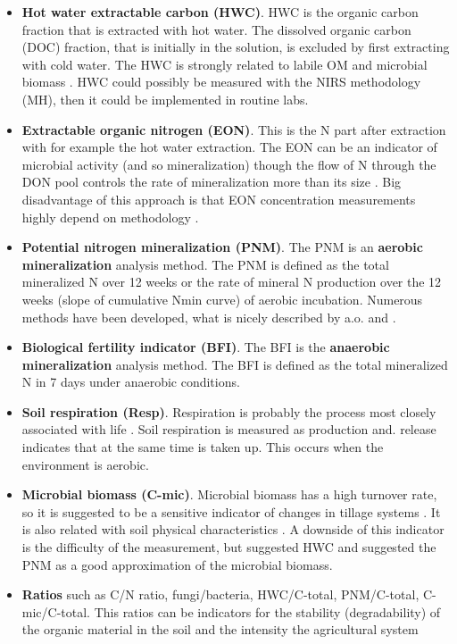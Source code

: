 \documentclass[10pt,twoside,dutch,english]{report}
\begin{document}
\begin{itemize}
	\item \textbf{Hot water extractable carbon (HWC)}. HWC is the organic carbon fraction that is extracted with hot water. The dissolved organic carbon (DOC) fraction, that is initially in the solution, is excluded by first extracting with cold water.  The HWC is strongly related to labile OM and microbial biomass \citep{Ghani2002, Ghani2003}. HWC could possibly be measured with the NIRS methodology (MH), then it could be implemented in routine labs. 
	\item \textbf{Extractable organic nitrogen (EON)}. This is the N part after extraction with for example the hot water extraction. The EON can be an indicator of microbial activity (and so mineralization) though the flow of N through the DON pool controls the rate of mineralization more than its size \citep{Schimel2004}. Big disadvantage of this approach is that EON concentration measurements highly depend on methodology \citep{Ros2009}. 
	
	\item \textbf{Potential nitrogen mineralization (PNM)}. The PNM is an \textbf{aerobic mineralization} analysis method. The PNM is defined as the total mineralized N over 12 weeks or the rate of mineral N production over the 12 weeks (slope of cumulative Nmin curve) of aerobic incubation. Numerous methods have been developed, what is nicely described by a.o. \citet{Doran1996} and \citet{Canali2005}.
	
	\item \textbf{Biological fertility indicator (BFI)}. The BFI is the \textbf{anaerobic mineralization} analysis method. The BFI is defined as the total mineralized N in 7 days under anaerobic conditions.
	
	\item \textbf{Soil respiration (Resp)}. Respiration is probably the process most closely associated with life \citep{Bloem2005}. Soil respiration is measured as  production and.  release indicates  that at the same time  is taken up. This occurs when the environment is aerobic.
	
	\item \textbf{Microbial biomass (C-mic)}. Microbial biomass has a high turnover rate, so it is suggested to be a sensitive indicator of changes in tillage systems \citep{Lynch1980, Sparling1997}. It is also related with soil physical characteristics \citep{Schimel1986}. A downside of this indicator is the difficulty of the measurement, but \citet{Sparling1992} suggested HWC and \citet{Myrold1987} suggested the PNM as a good approximation of the microbial biomass. 
	
	\item \textbf{Ratios} such as C/N ratio, fungi/bacteria, HWC/C-total, PNM/C-total, C-mic/C-total. This ratios can be indicators for the stability (degradability) of the organic material in the soil \citep{Sparling1992, Hanegraaf2009} and the intensity the agricultural system \citep{Bloem2004}
	
\end{itemize}
		
\end{document}
